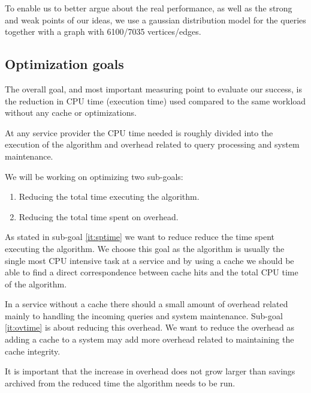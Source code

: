 To enable us to better argue about the real performance, as well as the strong and weak points of our ideas, we use a gaussian distribution model for the queries together with a graph with 6100/7035 vertices/edges.


\subsection{Optimization goals}\label{subsec:goals}

The overall goal, and most important measuring point to evaluate our success, is the reduction in CPU time (execution time) used compared to the same workload without any cache or optimizations.

At any \spath service provider the CPU time needed is roughly divided into the execution of the \spath algorithm and overhead related to query processing and system maintenance. 

We will be working on optimizing two sub-goals:
\begin{enumerate}
\item \label{it:sptime} Reducing the total time executing the \spath algorithm.
\item \label{it:ovtime} Reducing the total time spent on overhead.
\end{enumerate}


As stated in sub-goal \ref{it:sptime} we want to reduce reduce the time spent executing the \spath algorithm. We choose this goal as the \spath algorithm is usually the single most CPU intensive task at a \spath service \cite{ref.} and by using a cache we should be able to find a direct correspondence between cache hits and the total CPU time of the \spath algorithm.

In a \spath service without a cache there should a small amount of overhead related mainly to handling the incoming queries and system maintenance. Sub-goal \ref{it:ovtime} is about reducing this overhead. We want to reduce the overhead as adding a cache to a \spath system may add more overhead related to maintaining the cache integrity.

It is important that the increase in overhead does not grow larger than savings archived from the reduced time the \spath algorithm needs to be run.



